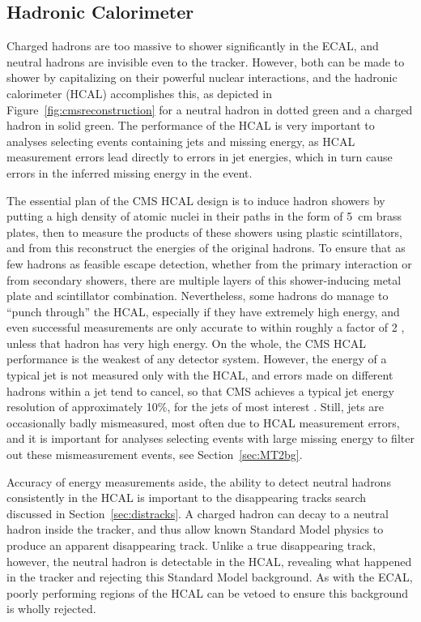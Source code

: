   \subsection{Hadronic Calorimeter} \label{sec:hcal}

  Charged hadrons are too massive to shower significantly in the ECAL, and neutral hadrons are invisible even to the tracker.
  However, both can be made to shower by capitalizing on their powerful nuclear interactions, and the hadronic calorimeter (HCAL) accomplishes this, as depicted in Figure~\ref{fig:cmsreconstruction} for a neutral hadron in dotted green and a charged hadron in solid green.
  The performance of the HCAL is very important to analyses selecting events containing jets and missing energy, as HCAL measurement errors lead directly to errors in jet energies, which in turn cause errors in the inferred missing energy in the event.

  The essential plan of the CMS HCAL design is to induce hadron showers by putting a high density of atomic nuclei in their paths in the form of 5~cm brass plates, then to measure the products of these showers using plastic scintillators, and from this reconstruct the energies of the original hadrons.
  To ensure that as few hadrons as feasible escape detection, whether from the primary interaction or from secondary showers, there are multiple layers of this shower-inducing metal plate and scintillator combination.
  Nevertheless, some hadrons do manage to ``punch through'' the HCAL, especially if they have extremely high energy, and even successful measurements are only accurate to within roughly a factor of 2 \cite{HCALphase1}, unless that hadron has very high energy.
  On the whole, the CMS HCAL performance is the weakest of any detector system.
  However, the energy of a typical jet is not measured only with the HCAL, and errors made on different hadrons within a jet tend to cancel, so that CMS achieves a typical jet energy resolution of approximately 10\%, for the jets of most interest \cite{cms_tdr}.
  Still, jets are occasionally badly mismeasured, most often due to HCAL measurement errors, and it is important for analyses selecting events with large missing energy to filter out these mismeasurement events, see Section~\ref{sec:MT2bg}.

  Accuracy of energy measurements aside, the ability to detect neutral hadrons consistently in the HCAL is important to the disappearing tracks search discussed in Section~\ref{sec:distracks}.
  A charged hadron can decay to a neutral hadron inside the tracker, and thus allow known Standard Model physics to produce an apparent disappearing track.
  Unlike a true disappearing track, however, the neutral hadron is detectable in the HCAL, revealing what happened in the tracker and rejecting this Standard Model background.
  As with the ECAL, poorly performing regions of the HCAL can be vetoed to ensure this background is wholly rejected.

